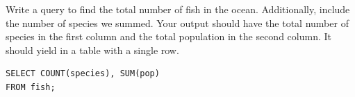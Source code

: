 \begin{blocksection}
Write a query to find the total number of fish in the ocean. Additionally, include the number of species we summed. Your output should have the total number of species in the first column and the total population in the second column. It should yield in a table with a single row.

\begin{solution}[0.7in]
\begin{lstlisting}
SELECT COUNT(species), SUM(pop) 
FROM fish;
\end{lstlisting}
\end{solution}
\end{blocksection}
